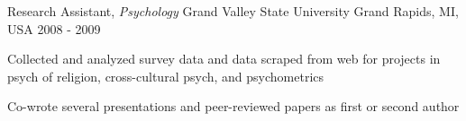 \begin{cventries}
 \cventry
    {Research Assistant, \textit{Psychology}} %
    {Grand Valley State University} %
    {Grand Rapids, MI, USA} %
    {2008 - 2009} %
   {
    \begin{cvitems}
    \item {Collected and analyzed survey data and data scraped from web for projects in psych of religion, cross-cultural psych, and psychometrics}
    \item {Co-wrote several presentations and peer-reviewed papers as first or second author} 
    \end{cvitems}
    }
\end{cventries}
